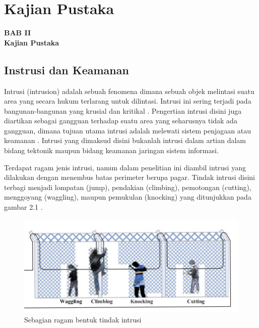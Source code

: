 \documentclass[12pt]{article}
\begin{document}



\newpage

	\setcounter{figure}{0}

	\section{Kajian Pustaka}
	
	\begin{center}
		{\large \textbf{BAB II}} \\
		{\large \textbf{Kajian Pustaka}}
	\end{center}

	\subsection{Instrusi dan Keamanan}
	
	Intrusi (intrusion) adalah sebuah fenomena dimana sebuah objek melintasi suatu area yang secara hukum terlarang untuk dilintasi.
	Intrusi ini sering terjadi pada bangunan-bangunan yang krusial dan kritikal \cite{Quwaider2017}.
	Pengertian intrusi disini juga diartikan sebagai gangguan terhadap suatu area yang seharusnya tidak ada gangguan, dimana tujuan utama intrusi adalah melewati sistem penjagaan atau keamanan \cite{Chapman}.
	Intrusi yang dimaksud disini bukanlah intrusi dalam artian dalam bidang tektonik maupun bidang keamanan jaringan sistem informasi.
	
	Terdapat ragam jenis intrusi, namun dalam penelitian ini diambil intrusi yang dilakukan dengan menembus batas perimeter berupa pagar.
	Tindak intrusi disini terbagi menjadi lompatan (jump), pendakian (climbing), pemotongan (cutting), menggoyang (waggling), maupun pemukulan (knocking) yang ditunjukkan pada gambar 2.1 \cite{Huang2017}.

	\begin{figure}[!h]
		\centering
		\captionsetup{justification=centering}
   		\includegraphics[width=0.7\linewidth]{images/Bab_2/Bab_2_1}
		\caption[Ragam Intrusi]{\small{Sebagian ragam bentuk tindak intrusi}}
	\end{figure}
\end{document}
